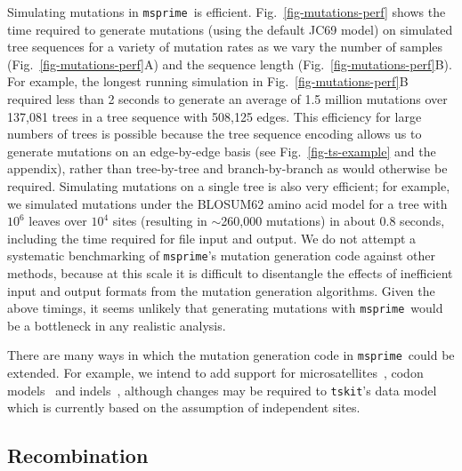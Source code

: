 \documentclass[9pt,twocolumn,twoside,lineno]{gsajnl}
\newcommand{\msprime}[0]{\texttt{msprime}}
\newcommand{\tskit}[0]{\texttt{tskit}}
\begin{document}
Simulating mutations in \msprime\ is efficient.
Fig.~\ref{fig-mutations-perf} shows the time required to generate
mutations (using the default JC69 model) on
simulated tree sequences for a variety of mutation
rates as we vary the number of samples
(Fig.~\ref{fig-mutations-perf}A) and the sequence
length (Fig.~\ref{fig-mutations-perf}B).
For example, the longest running simulation in
Fig.~\ref{fig-mutations-perf}B required less than 2 seconds to
generate an average of 1.5 million mutations over 137,081 trees
in a tree sequence with 508,125 edges.
This efficiency for large numbers of trees is possible because
the tree sequence encoding allows us to generate mutations
on an edge-by-edge basis
(see Fig.~\ref{fig-ts-example} and the~
appendix),
rather than tree-by-tree and branch-by-branch as would otherwise be required.
Simulating mutations on a single tree is also very efficient;
for example,
we simulated mutations under the BLOSUM62 amino
acid model for a tree with $10^6$ leaves over $10^4$ sites (resulting
in $\sim$260,000 mutations) in about $0.8$ seconds, including
the time required for file input and output.
We do not attempt a systematic benchmarking of \msprime's
mutation generation code against other methods, because at this scale it is
difficult to disentangle the effects of inefficient input and
output formats from the mutation generation algorithms.
Given the above timings, it seems unlikely
that generating mutations with \msprime\ would be a bottleneck in any
realistic analysis.

There are many ways in which the mutation generation code
in \msprime\ could be extended. For example, we intend to add support for
microsatellites~\citep{mailund2005coasim},
codon models~\citep{arenas2007recodon}
and indels~\citep{cartwright2005dna,fletcher2009indelible},
although changes may be required to \tskit's data model
which is currently based on the assumption of independent sites.

\subsection*{Recombination}
\label{sec-recombination}
\end{document}
